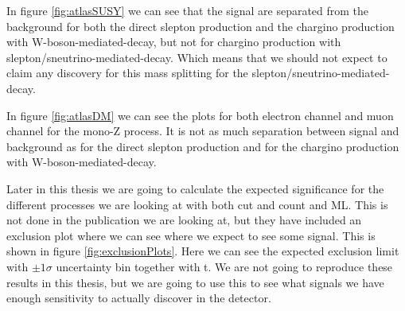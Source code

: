 In figure \ref{fig:atlasSUSY} we can see that the signal are separated from the background for both the direct slepton production and the chargino production with W-boson-mediated-decay, but not for chargino production with slepton/sneutrino-mediated-decay. Which means that we should not expect to claim any discovery for this mass splitting for the slepton/sneutrino-mediated-decay. 

In figure \ref{fig:atlasDM} we can see the plots for both electron channel and muon channel for the mono-Z process. It is not as much separation between signal and background as for the direct slepton production and for the chargino production with W-boson-mediated-decay.

Later in this thesis we are going to calculate the expected significance for the different processes we are looking at with both cut and count and ML. This is not done in the publication we are looking at, but they have included an exclusion plot where we can see where we expect to see some signal. This is shown in figure \ref{fig:exclusionPlots}. Here we can see the expected exclusion limit with $\pm1\sigma$ uncertainty bin together with t. We are not going to reproduce these results in this thesis, but we are going to use this to see what signals we have enough sensitivity to actually discover in the detector.

